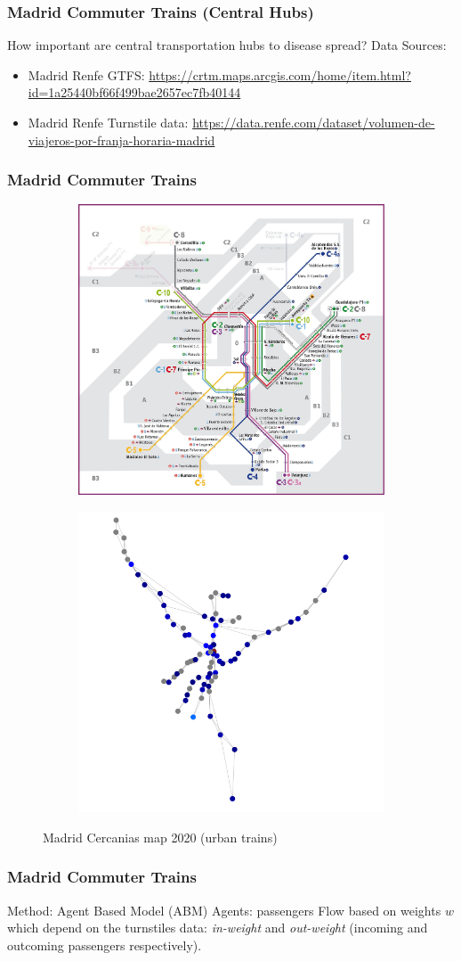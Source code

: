 \documentclass{beamer}
\begin{document}
\begin{frame}
\frametitle{Madrid Commuter Trains (Central Hubs)}
How important are central transportation hubs to disease spread?\linebreak
\linebreak
Data Sources:
\begin{itemize}
	\item Madrid Renfe GTFS: \url{https://crtm.maps.arcgis.com/home/item.html?id=1a25440bf66f499bae2657ec7fb40144}
	\item Madrid Renfe Turnstile data: \url{https://data.renfe.com/dataset/volumen-de-viajeros-por-franja-horaria-madrid}
\end{itemize}
\end{frame}
\begin{frame}
\frametitle{Madrid Commuter Trains}
\begin{figure}
	\centering
	\begin{subfigure}
		\centering
		\includegraphics[width=.4\linewidth]{Scratch_Visuals/madrid-cercanias-map-fix.png}
	\end{subfigure}%
	\begin{subfigure}
		\centering
		\includegraphics[width=.4\linewidth]{Scratch_Visuals/madrid-cercanias-map-py.png}
	\end{subfigure}
	\caption{Madrid Cercanias map 2020 (urban trains)}
\end{figure}
\end{frame}
\begin{frame}
\frametitle{Madrid Commuter Trains}
Method: Agent Based Model (ABM)\linebreak
Agents: passengers\linebreak
Flow based on weights $w$ which depend on the turnstiles data: \textit{in-weight} and \textit{out-weight} (incoming and outcoming passengers respectively).
\end{frame}
\end{document}
